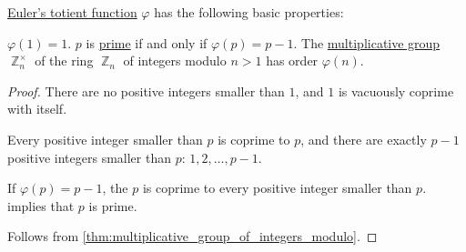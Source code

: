 \begin{proposition}\label{thm:def:eulers_totient_function}
  \hyperref[def:eulers_totient_function]{Euler's totient function} \( \varphi \) has the following basic properties:
  \begin{thmenum}
     \( \varphi(1) = 1 \).
     \( p \) is \hyperref[def:prime_number]{prime} if and only if \( \varphi(p) = p - 1 \).
     The \hyperref[def:semiring]{multiplicative group} \( \BbbZ_n^\times \) of the ring \hyperref[def:ring_of_integers_modulo]{\( \BbbZ_n \)} of integers modulo \( n > 1 \) has order \( \varphi(n) \).
  \end{thmenum}
\end{proposition}
\begin{proof}
   There are no positive integers smaller than \( 1 \), and \( 1 \) is vacuously coprime with itself.


  \SufficiencySubProof* Every positive integer smaller than \( p \) is coprime to \( p \), and there are exactly \( p - 1 \) positive integers smaller than \( p \): \( 1, 2, \ldots, p - 1 \).

  \NecessitySubProof* If \( \varphi(p) = p - 1 \), the \( p \) is coprime to every positive integer smaller than \( p \).  implies that \( p \) is prime.

   Follows from \cref{thm:multiplicative_group_of_integers_modulo}.
\end{proof}

